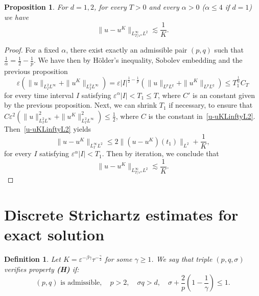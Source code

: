 \documentclass[10pt,a4paper]{article}
\newtheorem{definition}[theorem]{Definition}
\newtheorem{proposition}[theorem]{Proposition}
\begin{document}
  \begin{proposition}\label{u-uKLinftyL2d12}
    For \(d=1,2\), for every \(T>0\) and every \(\alpha>0\) (\(\alpha \leq 4\) if \(d=1\)) 
    we have 
    \begin{equation}
      \|u-u^K\|_{L^\infty_{T/\varepsilon^\alpha}L^2} \lesssim \frac1K.
    \end{equation}
  \end{proposition}

  \begin{proof}
    For a fixed \(\alpha\), there exist exactly an admissible pair \((p,q)\) such 
    that \(\frac1\alpha = \frac12 - \frac1p\). We have then by H\"older's 
    inequality, Sobolev embedding and the previous proposition 
    \begin{equation}\label{uL2Linfty}
      \varepsilon (\|u\|_{L^2_I L^\infty} + \|u^K\|_{L^2_I L^\infty}) = 
      \varepsilon |I|^{\frac12-\frac1p} (\|u\|_{L^p L^q} + \|u^K\|_{L^p L^q}) 
      \leq T_1^{\frac1\alpha} C_T
    \end{equation}
    for every time interval \(I\) satisfying \(\varepsilon^\alpha |I| <
    T_1 \leq T\), where \(C'\) is an constant given by the previous proposition.
    Next, we can shrink \(T_1\) if necessary, to ensure that
    \(C\varepsilon^2 (\|u\|_{L^2_I L^\infty}^2 + \|u^K\|_{L^2_I L^\infty}^2)
    \leq \frac12\), where \(C\) is the constant in~\eqref{u-uKLinftyL2}. 
    Then~\eqref{u-uKLinftyL2} yields 
    \[ \|u-u^K\|_{L^\infty_I L^2} \leq 2\|(u-u^K)(t_1)\|_{L^2} + \frac1K, \]
    for every \(I\) satisfying \(\varepsilon^\alpha |I| < T_1\). Then by
    iteration, we conclude that 
    \[ \|u-u^K\|_{L^\infty_{T/\varepsilon^\alpha}L^2} \lesssim \frac1K. \]
  \end{proof}

  \section{Discrete Strichartz estimates for exact solution}\label{sec:DSE-exact-sol}


  \begin{definition}
    Let \(K=\varepsilon^{-\beta\gamma}\tau^{-\frac\gamma2}\) for some \(\gamma
    \geq 1\). We say that triple \((p,q,\sigma)\) verifies property {\bf (H)}
    if:
    \[ (p,q) \text{ is admissible}, \quad p>2,\quad \sigma q > d, \quad 
    \sigma + \frac2p\left(1-\frac1\gamma\right) \leq 1 .
    \]
  \end{definition}
\end{document}
